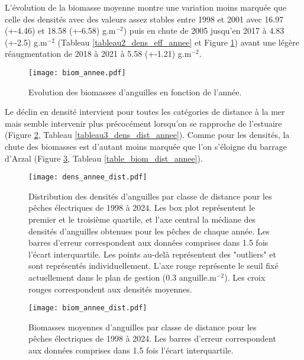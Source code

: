 \documentclass[10pt,twocolumn,titlepage,twoside]{article}\usepackage[]{graphicx}\usepackage[]{xcolor}
\begin{document}
L'évolution de la biomasse moyenne montre une variation moins marquée que celle
des densités avec des valeurs assez stables entre 1998 et 2001 avec 
16.97 (+-4.46) et
18.58 (+-6.58) g.m$^{-2}$) puis en chute de 2005 jusqu'en 2017
à 4.83  (+-2.5) g.m$^{-2}$ (Tableau \ref{tableau2_dens_eff_annee}
et Figure \ref{biom_annee}) avant une légère réaugmentation de 2018 à 2021 à
5.58  (+-1.21) g.m$^{-2}$.


\begin{figure}[htbp]
\centering
 \texttt{[image: biom\_annee.pdf]} 
\caption[Biomasses d'anguilles.]{Evolution des biomasses d'anguilles en fonction
de l'année.}
\label{biom_annee}
\end{figure}

Le déclin en densité intervient pour toutes les catégories de distance à la mer 
mais semble intervenir plus précocément
lorsqu'on se rapproche de l'estuaire (Figure \ref{dens_annee_distance},
Tableau \ref{tableau3_dens_dist_annee}).
Comme pour les densités, la chute des biomasses est
d'autant moins marquée que l'on s'éloigne du barrage d'Arzal (Figure
\ref{biom_annee_dist}, Tableau \ref{table_biom_dist_annee}).

\begin{figure}[htbp]
  \centering
    \texttt{[image: dens\_annee\_dist.pdf]}
    \caption[Densité moyennes $\sim$ distance.]{Distribution des densités
    d'anguilles par classe de distance pour les pêches
    électriques de 1998 à 2024. Les box plot représentent le premier
    et le troisième quartile, et l'axe central la médiane des densités
    d'anguilles obtenues pour les pêches de chaque année. Les barres d'erreur correspondent aux données comprises dans 1.5 fois l'écart
    interquartile. Les points au-delà représentent des "outliers" et sont
    représentés individuellement. L'axe rouge représente le seuil fixé
    actuellement dans le plan de gestion (0.3 anguille.m$^{-2}$).
     Les croix rouges correspondent aux densités
    moyennes.}
  \label{dens_annee_distance}
\end{figure} 
    
\small

\normalsize

\begin{figure}[htbp]
  \centering
  \texttt{[image: biom\_annee\_dist.pdf]}
  \caption[_court]{Biomasses moyennes d'anguilles par classe de distance pour les pêches
  électriques de 1998 à 2024. Les barres d'erreur
  correspondent aux données comprises dans 1.5 fois
  l'écart interquartile.}
  \label{biom_annee_dist}
\end{figure}
\end{document}
